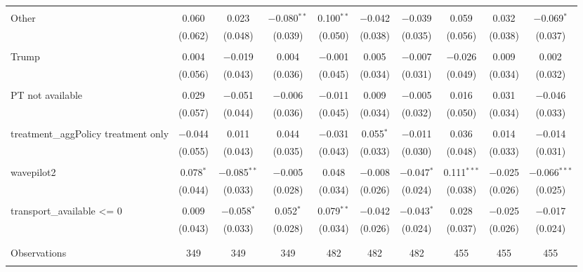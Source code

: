 \begin{tabular}{@{\extracolsep{5pt}}lccccccccc}
  & & & & & & & & & \\ 
 Other & 0.060 & 0.023 & $-$0.080$^{**}$ & 0.100$^{**}$ & $-$0.042 & $-$0.039 & 0.059 & 0.032 & $-$0.069$^{*}$ \\ 
  & (0.062) & (0.048) & (0.039) & (0.050) & (0.038) & (0.035) & (0.056) & (0.038) & (0.037) \\ 
  & & & & & & & & & \\ 
 Trump & 0.004 & $-$0.019 & 0.004 & $-$0.001 & 0.005 & $-$0.007 & $-$0.026 & 0.009 & 0.002 \\ 
  & (0.056) & (0.043) & (0.036) & (0.045) & (0.034) & (0.031) & (0.049) & (0.034) & (0.032) \\ 
  & & & & & & & & & \\ 
 PT not available & 0.029 & $-$0.051 & $-$0.006 & $-$0.011 & 0.009 & $-$0.005 & 0.016 & 0.031 & $-$0.046 \\ 
  & (0.057) & (0.044) & (0.036) & (0.045) & (0.034) & (0.032) & (0.050) & (0.034) & (0.033) \\ 
  & & & & & & & & & \\ 
 treatment\_aggPolicy treatment only & $-$0.044 & 0.011 & 0.044 & $-$0.031 & 0.055$^{*}$ & $-$0.011 & 0.036 & 0.014 & $-$0.014 \\ 
  & (0.055) & (0.043) & (0.035) & (0.043) & (0.033) & (0.030) & (0.048) & (0.033) & (0.031) \\ 
  & & & & & & & & & \\ 
 wavepilot2 & 0.078$^{*}$ & $-$0.085$^{**}$ & $-$0.005 & 0.048 & $-$0.008 & $-$0.047$^{*}$ & 0.111$^{***}$ & $-$0.025 & $-$0.066$^{***}$ \\ 
  & (0.044) & (0.033) & (0.028) & (0.034) & (0.026) & (0.024) & (0.038) & (0.026) & (0.025) \\ 
  & & & & & & & & & \\ 
 transport\_available \textless = 0 & 0.009 & $-$0.058$^{*}$ & 0.052$^{*}$ & 0.079$^{**}$ & $-$0.042 & $-$0.043$^{*}$ & 0.028 & $-$0.025 & $-$0.017 \\ 
  & (0.043) & (0.033) & (0.028) & (0.034) & (0.026) & (0.024) & (0.037) & (0.026) & (0.024) \\ 
  & & & & & & & & & \\ 
\hline \\[-1.8ex] 

Observations & 349 & 349 & 349 & 482 & 482 & 482 & 455 & 455 & 455 \\ 
\hline 
\hline \\[-1.8ex] 
\end{tabular} 